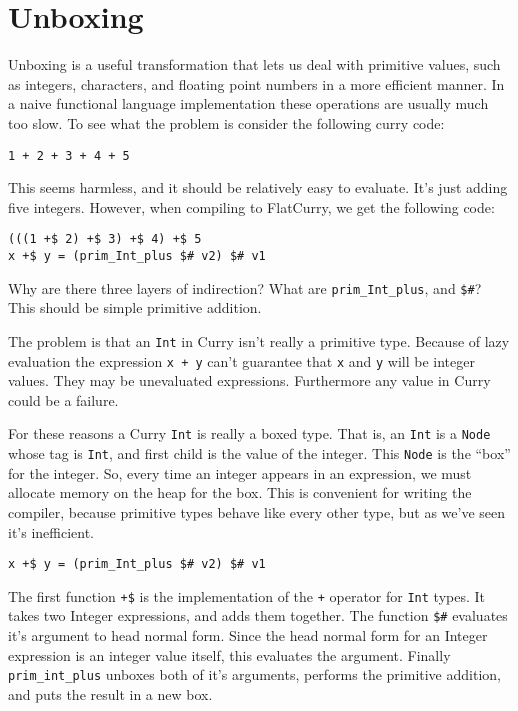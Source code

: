 \documentclass{article}
\begin{document}
\section{Unboxing}
Unboxing is a useful transformation that lets us deal with primitive values, 
such as integers, characters, and floating point numbers in a more efficient manner.
In a naive functional language implementation these operations are usually much too slow.
To see what the problem is consider the following curry code:

\begin{verbatim}
1 + 2 + 3 + 4 + 5
\end{verbatim}

This seems harmless, and it should be relatively easy to evaluate.
It's just adding five integers.
However, when compiling to FlatCurry, we get the following code:

\begin{verbatim}
(((1 +$ 2) +$ 3) +$ 4) +$ 5
x +$ y = (prim_Int_plus $# v2) $# v1
\end{verbatim}

Why are there three layers of indirection?
What are \texttt{prim\_Int\_plus}, and \texttt{\$\#}?
This should be simple primitive addition.

The problem is that an \texttt{Int} in Curry isn't really a primitive type.
Because of lazy evaluation the expression \texttt{x + y} can't guarantee that
\texttt x and \texttt y will be integer values.  They may be unevaluated expressions.
Furthermore any value in Curry could be a failure.

For these reasons a Curry \texttt{Int} is really a boxed type.
That is, an \texttt{Int} is a \texttt{Node} whose tag is \texttt{Int}, and first child is the value of the integer.
This \texttt{Node} is the ``box'' for the integer.
So, every time an integer appears in an expression, we must allocate memory on the heap for the box.
This is convenient for writing the compiler, because primitive types behave like every other type,
but as we've seen it's inefficient.

\begin{verbatim}
x +$ y = (prim_Int_plus $# v2) $# v1
\end{verbatim}

The first function \texttt{+\$} is the implementation of the \texttt{+} operator for \texttt{Int} types.
It takes two Integer expressions, and adds them together.
The function \texttt{\$\#} evaluates it's argument to head normal form.
Since the head normal form for an Integer expression is an integer value itself, this evaluates the argument.
Finally \texttt{prim\_int\_plus} unboxes both of it's arguments, performs the primitive addition,
and puts the result in a new box.
\end{document}
